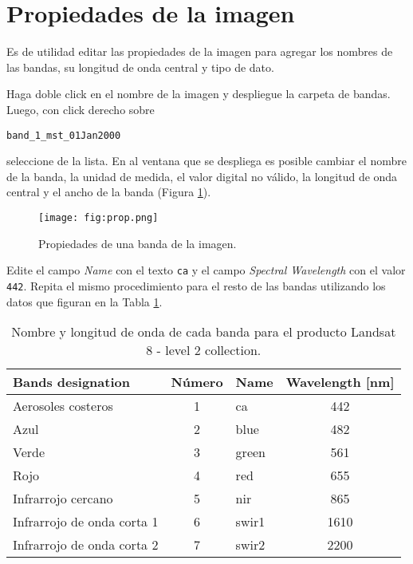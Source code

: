 \section{Propiedades de la imagen}
Es de utilidad editar las propiedades de la imagen para agregar los nombres de las bandas, su longitud de onda central y tipo de dato.

Haga doble click en el nombre de la imagen y despliegue la carpeta de bandas. Luego, con click derecho sobre
\begin{center}
\texttt{band\_1\_mst\_01Jan2000}
\end{center}
seleccione  de la lista. En al ventana que se despliega es posible cambiar el nombre de la banda, la unidad de medida, el valor digital no válido, la longitud de onda central y el ancho de la banda (Figura \ref{fig:prop}).

\begin{figure}[h!]
    \centering
    \texttt{[image: fig:prop.png]}
    \caption{Propiedades de una banda de la imagen.}
    \label{fig:prop}
\end{figure}

Edite el campo \emph{Name} con el texto \texttt{ca} y el campo \emph{Spectral Wavelength} con el valor \texttt{442}. Repita el mismo procedimiento para el resto de las bandas utilizando los datos que figuran en la Tabla \ref{tab:landsat8}.

\begin{table}[h!]
  \centering
  \begin{tabular}{@{}lclc@{}}
  \toprule
  Bands designation          & Número & Name  & Wavelength {[}nm{]} \\ \midrule
  Aerosoles costeros         & 1      & ca    & 442                 \\
  Azul                       & 2      & blue  & 482                 \\
  Verde                      & 3      & green & 561                 \\
  Rojo                       & 4      & red   & 655                 \\
  Infrarrojo cercano         & 5      & nir   & 865                 \\
  Infrarrojo de onda corta 1 & 6      & swir1 & 1610                \\
  Infrarrojo de onda corta 2 & 7      & swir2 & 2200                \\ \bottomrule
  \end{tabular}
\caption{Nombre y longitud de onda de cada banda para el producto Landsat 8 - level 2 collection.}
\label{tab:landsat8}
\end{table}


